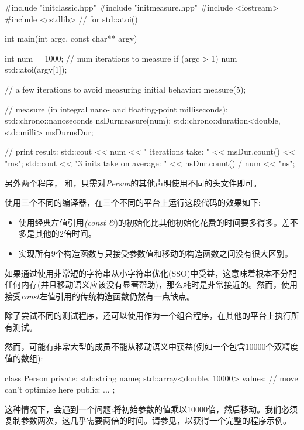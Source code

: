 \begin{cppcode}
#include "initclassic.hpp"
#include "initmeasure.hpp"
#include <iostream>
#include <cstdlib> // for std::atoi()

int main(int argc, const char** argv)
{
	int num = 1000; // num iterations to measure
	if (argc > 1) {
		num = std::atoi(argv[1]);
	}

	// a few iterations to avoid measuring initial behavior:
	measure(5);
	
	// measure (in integral nano- and floating-point milliseconds):
	std::chrono::nanoseconds nsDur{measure(num)};
	std::chrono::duration<double, std::milli> msDur{nsDur};
	
	// print result:
	std::cout << num << " iterations take: "
	<< msDur.count() << "ms\n";
	std::cout << "3 inits take on average: "
	<< nsDur.count() / num << "ns\n";
}
\end{cppcode}

另外两个程序， 和，只需对\textit{Person}的其他声明使用不同的头文件即可。

使用三个不同的编译器，在三个不同的平台上运行这段代码的效果如下:

\begin{itemize}
	\item 使用经典左值引用\textit{(const \&})的初始化比其他初始化花费的时间要多得多。差不多是其他的2倍时间。
	\item 实现所有9个构造函数与只接受参数值和移动的构造函数之间没有很大区别。
\end{itemize}

如果通过使用非常短的字符串从小字符串优化(SSO)中受益，这意味着根本不分配任何内存(并且移动语义应该没有显著帮助)，那么耗时是非常接近的。然而，使用接受\textit{const}左值引用的传统构造函数仍然有一点缺点。

除了尝试不同的测试程序，还可以使用作为一个组合程序，在其他的平台上执行所有测试。

然而，可能有非常大型的成员不能从移动语义中获益(例如一个包含10000个双精度值的数组):

\begin{cppcode}
class Person {
private:
	std::string name;
	std::array<double, 10000> values; // move can’t optimize here
public:
	...
};
\end{cppcode}

这种情况下，会遇到一个问题:将初始参数的值乘以10000倍，然后移动。我们必须复制参数两次，这几乎需要两倍的时间。请参见，以获得一个完整的程序示例。

